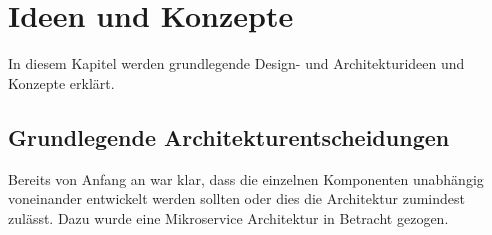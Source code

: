 \chapter{Ideen und Konzepte}




%



%
%

In diesem Kapitel werden grundlegende Design- und Architekturideen und Konzepte erklärt.

\section{Grundlegende Architekturentscheidungen}
\label{konzepte:microservices}

Bereits von Anfang an war klar, dass die einzelnen Komponenten unabhängig voneinander
entwickelt werden sollten oder dies die Architektur zumindest zulässt. Dazu wurde
eine Mikroservice Architektur in Betracht gezogen.

